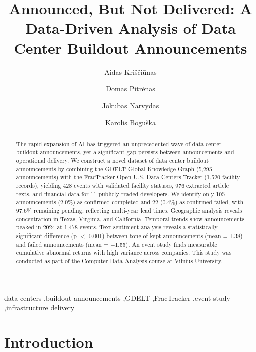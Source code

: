 \documentclass[5p,12pt]{elsarticle}
\begin{document}
\begin{frontmatter}

\title{Announced, But Not Delivered: A Data-Driven Analysis of Data Center Buildout Announcements}

\author[1]{Aidas Kriščiūnas}
\author[1]{Domas Pitrėnas}
\author[1]{Jokūbas Narvydas}
\author[1]{Karolis Boguška}
\address[1]{Quantitative Economics second-year students, Faculty of Economics and Business Administration (FEBA), Vilnius University, Vilnius, Lithuania}

\begin{abstract}
The rapid expansion of AI has triggered an unprecedented wave of data center buildout announcements, yet a significant gap persists between announcements and operational delivery. We construct a novel dataset of data center buildout announcements by combining the GDELT Global Knowledge Graph (5,295 announcements) with the FracTracker Open U.S. Data Centers Tracker (1,520 facility records), yielding 428 events with validated facility statuses, 976 extracted article texts, and financial data for 11 publicly-traded developers. We identify only 105 announcements (2.0\%) as confirmed completed and 22 (0.4\%) as confirmed failed, with 97.6\% remaining pending, reflecting multi-year lead times. Geographic analysis reveals concentration in Texas, Virginia, and California. Temporal trends show announcements peaked in 2024 at 1,478 events. Text sentiment analysis reveals a statistically significant difference (p $<$ 0.001) between tone of kept announcements (mean = 1.38) and failed announcements (mean = $-$1.55). An event study finds measurable cumulative abnormal returns with high variance across companies. This study was conducted as part of the Computer Data Analysis course at Vilnius University.
\end{abstract}

\begin{keyword}
data centers \sep buildout announcements \sep GDELT \sep FracTracker \sep event study \sep infrastructure delivery
\end{keyword}

\end{frontmatter}

\section{Introduction}
\end{document}
